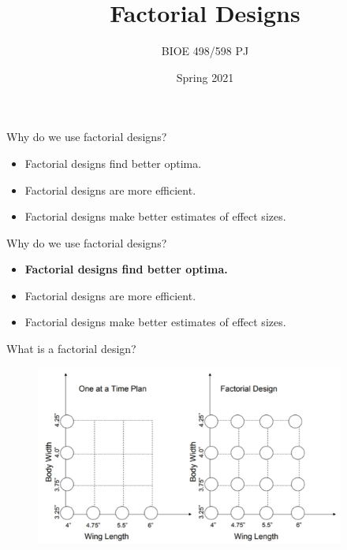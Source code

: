 \documentclass[10pt]{beamer}
\title{Factorial Designs}
\author{BIOE 498/598 PJ}
\date{Spring 2021}
\begin{document}
\frame{\titlepage}




\begin{frame}{Why do we use factorial designs?}

\begin{itemize}
\item Factorial designs find better optima.
\item Factorial designs are more efficient.
\item Factorial designs make better estimates of effect sizes.
\end{itemize}

\end{frame}

\begin{frame}{Why do we use factorial designs?}

\begin{itemize}
\item
  \textbf{Factorial designs find better optima.}
\item
  Factorial designs are more efficient.
\item
  Factorial designs make better estimates of effect sizes.
\end{itemize}

\end{frame}

\begin{frame}{What is a factorial design?}

\begin{figure}
\centering
\includegraphics[width=4in]{figures/factorial1.png}
\end{figure}

\end{frame}
\end{document}
